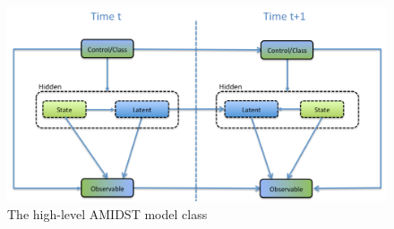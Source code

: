 \begin{figure}[ht!]
\begin{center}
\includegraphics[scale=0.4]{./figures/AMIDSTModelClassGeneral}
\caption{\label{Figure:AMIDSTModelClassHighLevel} The high-level AMIDST model class}
\end{center}
\end{figure}
